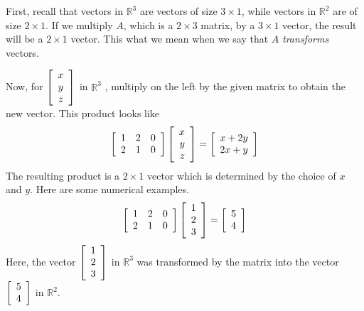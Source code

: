 \begin{solution}
First, recall that vectors in $\mathbb{R}^3$ are vectors of size $ 3 \times 1$, while vectors in $
\mathbb{R}^{2}$ are of size $2 \times 1$. If we multiply $A$, which is a $2 \times 3$ matrix, by a $3 \times 1$ vector,
the result will be a $2 \times 1$ vector. This what we mean when we say that $A$ {\em transforms \em} vectors.

Now, for $\left[
\begin{array}{c}
x \\
y \\
z
\end{array}
\right] $ in $\mathbb{R}^3$ , multiply on the left by the given matrix to obtain the new
vector. This product looks like 
\begin{equation*}
\left[
\begin{array}{rrr}
1 & 2 & 0 \\
2 & 1 & 0
\end{array}
\right] 
\left[
\begin{array}{r}
x \\
y \\
z
\end{array}
\right] = 
\left[
\begin{array}{c}
x+2y \\
2x+y
\end{array}
\right]
\end{equation*}
The resulting product is a $2 \times 1$ vector which is determined by the choice of $x$ and $y$. 
 Here are some numerical examples.
\begin{equation*}
\left[
\begin{array}{ccc}
1 & 2 & 0 \\
2 & 1 & 0
\end{array}
\right] \left[
\begin{array}{c}
1 \\
2 \\
3
\end{array}
\right] =\allowbreak \left[
\begin{array}{c}
5 \\
4
\end{array}
\right]
\end{equation*}
Here, the vector
$\left[
\begin{array}{c}
1 \\
2 \\
3
\end{array} \right]$
in $\mathbb{R}^3$ was transformed by the matrix into the vector
$\left[
\begin{array}{c} 
5 \\
4
\end{array}\right]$
in $\mathbb{R}^2$. 
 

\end{solution}
